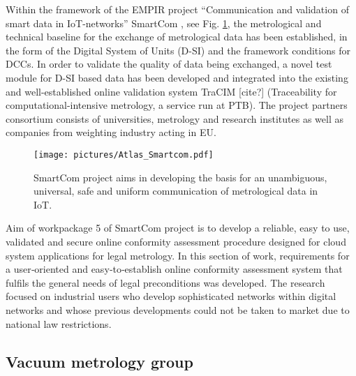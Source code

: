 \documentclass[3p,times,procedia]{elsarticle}
\begin{document}
Within the framework of the EMPIR project “Communication and validation of smart data in IoT-networks” SmartCom \cite{SmartCom}, see Fig. \ref{fig:SmartCom_logo}, the metrological and technical baseline for the exchange of metrological data has been established, in the form of the Digital System of Units (D-SI) and the framework conditions for DCCs. In order to validate the quality of data being exchanged, a novel test module for D-SI based data has been developed and integrated into the existing and well-established online validation system TraCIM [cite?] (Traceability for computational-intensive metrology, a service run at PTB). The project partners consortium consists of universities, metrology and research institutes as well as companies from weighting industry acting in EU. 

\begin{figure}
    \centering
    \texttt{[image: pictures/Atlas\_Smartcom.pdf]}
    \caption{SmartCom project aims in developing the basis for an unambiguous, universal, safe and uniform communication of metrological data in IoT. }
    \label{fig:SmartCom_logo}
\end{figure}

Aim of workpackage 5 of SmartCom project is to develop a reliable, easy to use, validated and secure online conformity assessment procedure designed for cloud system applications for legal metrology. In this section of work, requirements for a user‐oriented and easy‐to‐establish online conformity assessment system that fulfils the general needs of legal preconditions was developed. The research focused on industrial users who develop sophisticated networks within digital networks and whose previous developments could not be taken to market due to national law restrictions.

\subsection{Vacuum metrology group}

\end{document}
